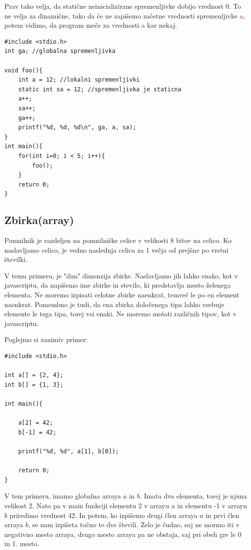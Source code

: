 \documentclass[a4paper, 12pt]{article}
\begin{document}
Prav tako velja, da statične neinicializirane spremenljivke dobijo vrednost 0. To ne velja za dinamične, tako da če ne zapišemo začetne vrednosti spremenljivke \textcolor{purple}{a}, potem vidimo, da program meče za vrednosti \textcolor{purple}{a} kar nekaj.

\begin{lstlisting}
#include <stdio.h>
int ga; //globalna spremenljivka

void foo(){
	int a = 12;	//lokalni spremenljivki
	static int sa = 12; //spremenljivka je staticna
	a++;
	sa++;
	ga++;
	printf("%d, %d, %d\n", ga, a, sa);
}
int main(){
	for(int i=0; i < 5; i++){
		foo();
	}
	return 0;
}	
\end{lstlisting}
\subsection{Zbirka(array)}
Pomnilnik je razdeljen na pomnilniške celice v velikosti 8 bitov na celico. Ko naslavljamo celico, je vedno naslednja celica za 1 večja od prejšne po vrstni številki. \

\begin{center}
\end{center}

V temu primeru, je "dim" dimenzija zbirke. Naslavljamo jih lahko enako, kot v javascriptu, da napišemo ime zbirke in stevilo, ki predstavlja mesto želenega elementa. Ne moremo izpisati celotne zbirke naenkrat, temveč le po en element naenkrat. Pomembno je tudi, da ena zbirka določenega tipa lahko vsebuje elemente le tega tipa, torej vsi enaki. Ne moremo mešati različnih tipov, kot v javascriptu.

Poglejmo si zanimiv primer:

\begin{lstlisting}
#include <stdio.h>

int a[] = {2, 4};
int b[] = {1, 3};

int main(){

	a[2] = 42;
	b[-1] = 42;

	printf("%d, %d", a[1], b[0]);

	return 0;
}
\end{lstlisting}

V tem primeru, imamo globalna arraya $a$ in $b$. Imata dva elementa, torej je njuna velikost 2. Nato pa v main funkciji elementu 2 v arrayu $a$ in elementu -1 v arrayu $b$ priredimo vrednost 42. In potem, ko izpišemo drugi člen arraya $a$ in prvi člen arraya $b$, se nam izpišeta točno te dve števili. Zelo je čudno, saj ne mormo iti v negativno mesto arraya, drugo mesto arraya pa ne obstaja, saj pri obeh gre le 0 in 1. mesto.
\end{document}
